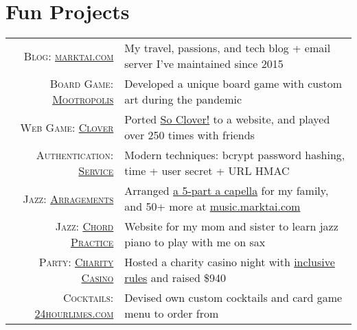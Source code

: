 \documentclass[a4paper,10pt]{article}
\begin{document}
\section{Fun Projects}

\begin{tabular}{r|p{13cm}}
 \textsc{Blog: \href{https://www.marktai.com}{marktai.com}} & My travel, passions, and tech blog + email server I've maintained since 2015 \\
 \textsc{Board Game: \href{http://mootropolis.marktai.com}{Mootropolis}} & Developed a unique board game with custom art during the pandemic \\
 \textsc{Web Game: \href{http://clover.marktai.com}{Clover}} & Ported \href{https://boardgamegeek.com/boardgame/329839/so-clover}{So Clover!} to a website, and played over 250 times with friends \\
 \textsc{Authentication: \href{https://github.com/marktai/marktai-auth}{Service}} & Modern techniques: bcrypt password hashing, time + user secret + URL HMAC \\
 \textsc{Jazz: \href{http://music.marktai.com}{Arragements}} & Arranged \href{http://marktai.com/s/16a8}{a 5-part a capella} for my family, and 50+ more at \href{http://music.marktai.com}{music.marktai.com} \\
 \textsc{Jazz: \href{http://chords.marktai.com/}{Chord Practice}} & Website for my mom and sister to learn jazz piano to play with me on sax \\
 \textsc{Party: \href{http://casino.marktai.com}{Charity Casino}} & Hosted a charity casino night with \href{https://docs.google.com/document/d/1ArbSpuDQg051XyNXSj3txQOdWGhOmlfMKesx0b-BMUE/edit}{inclusive rules} and raised \$940 \\
 \textsc{Cocktails: \href{http://24hourlimes.com}{24hourlimes.com}} & Devised own custom cocktails and card game menu to order from \\
\end{tabular}
\end{document}
